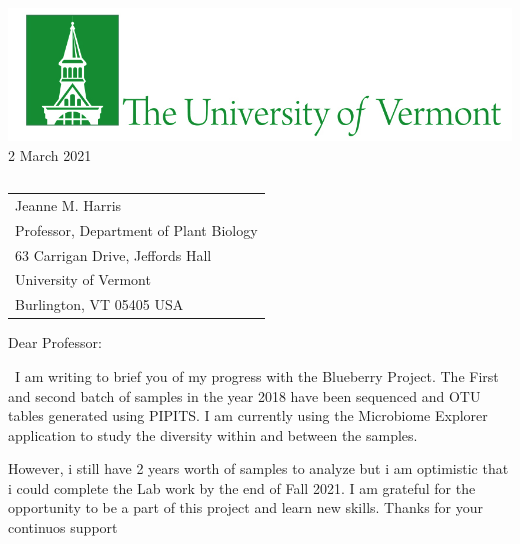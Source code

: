 \documentclass[10pt]{article}\usepackage[]{graphicx}\usepackage[]{color}
\begin{document}
\raggedright %
\includegraphics[scale=2]{UVMLogoSolid7484.jpg}\\ %

 \hfill\hfill\hfill %
 2 March 2021\\[10pt]  %
 
\begin{tabular}{l@{}}
\end{tabular}

\begin{tabular}{@{}l}
Jeanne M. Harris\\
Professor, Department of Plant Biology\\
63 Carrigan Drive, Jeffords Hall\\
University of Vermont\\
Burlington, VT 05405 USA
\end{tabular}


Dear Professor:

\ I am writing to brief you of my progress with the Blueberry Project. The First and second batch of samples in the year 2018 have been sequenced and OTU tables generated using PIPITS. I am currently using the Microbiome Explorer application to study the diversity within and between the samples. 

However, i still have 2 years worth of samples to analyze but i am optimistic that i could complete the Lab work by the end of Fall 2021. I am grateful for the opportunity to be a part of this project and learn new skills. Thanks for your continuos support
\end{document}

